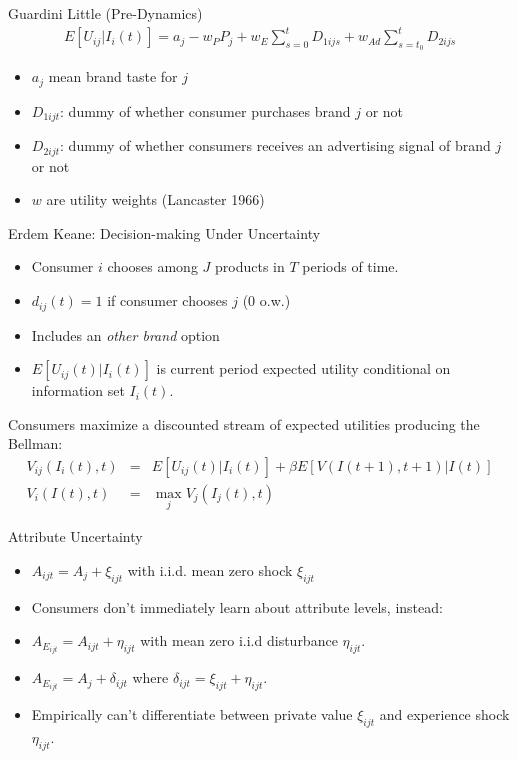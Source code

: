 \begin{frame}{Guardini Little (Pre-Dynamics)}
\begin{eqnarray*}
E[U_{ij} | I_i(t) ] = a_j -w_P P_j + w_E \sum_{s=0}^t D_{1ijs}  + w_{Ad} \sum_{s=t_0}^t D_{2ijs}
\end{eqnarray*}
\begin{itemize}
\item $a_j$ mean brand taste for $j$
\item $D_{1ijt}$: dummy of whether consumer purchases brand $j$ or not
\item $D_{2ijt}$: dummy of whether consumers receives an advertising signal of brand $j$ or not
\item $w$ are utility weights (Lancaster 1966)
\end{itemize}
\end{frame} 


\begin{frame}{Erdem Keane: Decision-making Under Uncertainty}
\begin{itemize}
\item Consumer $i$ chooses among $J$ products in $T$ periods of time.
\item $d_{ij}(t)=1$ if consumer chooses $j$ (0 o.w.)
\item Includes an \textit{other brand} option
\item $E[U_{ij}(t) | I_i(t)]$ is current period expected utility conditional on information set $I_i(t)$.
\end{itemize}
Consumers maximize a discounted stream of expected utilities producing the Bellman:
\begin{eqnarray*}
V_{ij}(I_i(t),t) &=& E[U_{ij}(t) | I_i(t)] + \beta E[V(I(t+1),t+1) | I(t)] \\
V_i(I(t),t) &=& \max_j V_j(I_j(t),t)
\end{eqnarray*}
\end{frame}


\begin{frame}{Attribute Uncertainty}
\begin{itemize}
\item $A_{ijt} = A_j + \xi_{ijt} $ with i.i.d. mean zero shock $\xi_{ijt}$
\item Consumers don't immediately learn about attribute levels, instead:
\item $A_{E_{ijt}} = A_{ijt} + \eta_{ijt}$ with mean zero i.i.d disturbance $\eta_{ijt}$.
\item $A_{E_{ijt}} = A_{j} + \delta_{ijt}$ where $\delta_{ijt} = \xi_{ijt} + \eta_{ijt}$.
\item Empirically can't differentiate between private value $\xi_{ijt}$ and experience shock $\eta_{ijt}$.
\end{itemize}
\end{frame}

